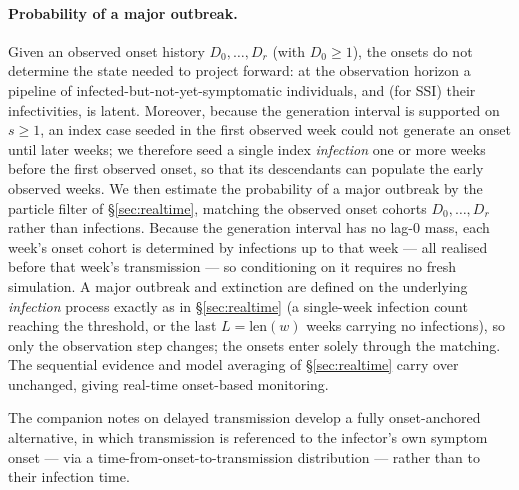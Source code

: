 \documentclass{article}
\theoremstyle{definition}
\begin{document}
\paragraph{Probability of a major outbreak.}
Given an observed onset history $D_0, \ldots, D_r$ (with $D_0 \geq 1$), the
onsets do not determine the state needed to project forward: at the observation
horizon a pipeline of infected-but-not-yet-symptomatic individuals, and (for SSI)
their infectivities, is latent.  Moreover, because the generation interval is
supported on $s \geq 1$, an index case seeded in the first observed week could
not generate an onset until later weeks; we therefore seed a single index
\emph{infection} one or more weeks before the first observed onset, so that its
descendants can populate the early observed weeks.  We then estimate the
probability of a major outbreak by the particle filter of \S\ref{sec:realtime},
matching the observed onset cohorts $D_0, \ldots, D_r$ rather than infections.
Because the generation interval has no lag-0 mass, each week's onset cohort is
determined by infections up to that week --- all realised before that week's
transmission --- so conditioning on it requires no fresh simulation.  A major
outbreak and extinction are defined on the underlying \emph{infection} process
exactly as in \S\ref{sec:realtime} (a single-week infection count reaching the
threshold, or the last $L = \mathrm{len}(w)$ weeks carrying no infections), so
only the observation step changes; the onsets enter solely through the matching.
The sequential evidence and model averaging of \S\ref{sec:realtime} carry over
unchanged, giving real-time onset-based monitoring.

The companion notes on delayed transmission develop a fully onset-anchored
alternative, in which transmission is referenced to the infector's own symptom
onset --- via a time-from-onset-to-transmission distribution --- rather than to
their infection time.
\end{document}
